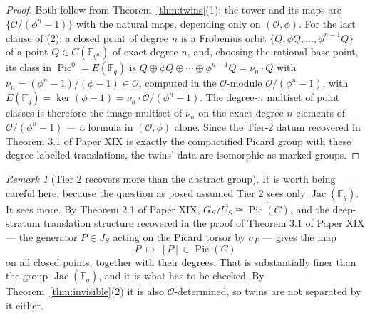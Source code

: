 \documentclass[11pt]{amsart}
\numberwithin{equation}{section}
\theoremstyle{definition}
\theoremstyle{remark}
\newtheorem{remark}[theorem]{Remark}
\newcommand{\F}{\mathbb{F}}
\newcommand{\cO}{\mathcal{O}}
\newcommand{\Pic}{\operatorname{Pic}}
\newcommand{\Jac}{\operatorname{Jac}}
\begin{document}
\begin{proof}
Both follow from Theorem~\ref{thm:twins}(1): the tower and its maps are
$\{\cO/(\phi^n-1)\}$ with the natural maps, depending only on $(\cO,\phi)$. For the last
clause of (2): a closed point of degree $n$ is a Frobenius orbit
$\{Q,\phi Q,\dots,\phi^{n-1}Q\}$ of a point $Q\in C(\F_{q^n})$ of exact degree $n$, and,
choosing the rational base point, its class in $\Pic^0=E(\F_q)$ is
$Q\oplus\phi Q\oplus\cdots\oplus\phi^{n-1}Q=\nu_n\cdot Q$ with
$\nu_n=(\phi^n-1)/(\phi-1)\in\cO$, computed in the $\cO$-module $\cO/(\phi^n-1)$, with
$E(\F_q)=\ker(\phi-1)=\nu_n\cdot\cO/(\phi^n-1)$. The degree-$n$ multiset of point classes is
therefore the image multiset of $\nu_n$ on the exact-degree-$n$ elements of
$\cO/(\phi^n-1)$ --- a formula in $(\cO,\phi)$ alone. Since the Tier-2 datum recovered in
Theorem 3.1 of Paper XIX is exactly the compactified Picard group with these degree-labelled
translations, the twins' data are isomorphic as marked groups.
\end{proof}

\begin{remark}[Tier 2 recovers more than the abstract group]\label{rem:tier2more}
It is worth being careful here, because the question as posed assumed Tier 2 sees only
$\Jac(\F_q)$. It sees more. By Theorem 2.1 of Paper XIX, $G_S/\overline{U_S}\cong\widehat{\Pic(C)}$,
and the deep-stratum translation structure recovered in the proof of Theorem 3.1 of Paper
XIX --- the generator $P\in J_S$ acting on the Picard torsor by $\sigma_P$ --- gives the map
\[
P\ \longmapsto\ [P]\in\Pic(C)
\]
on all closed points, together with their degrees. That is
substantially finer than the group $\Jac(\F_q)$, and it is what has to be checked. By
Theorem~\ref{thm:invisible}(2) it is also $\cO$-determined, so twins are not separated by it
either.
\end{remark}
\end{document}

